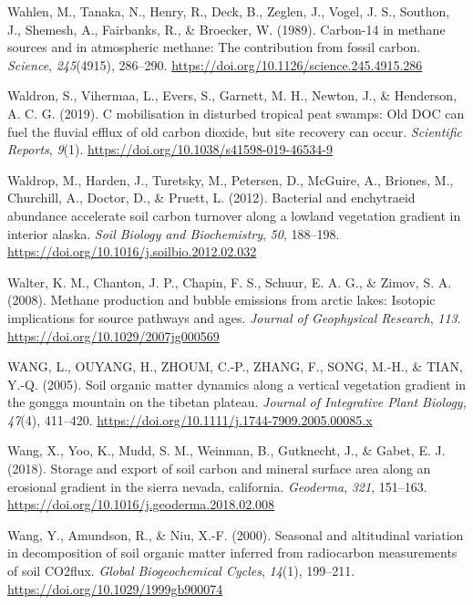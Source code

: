 \documentclass[]{article}
\begin{document}
\leavevmode\hypertarget{ref-Wahlen_1989}{}%
Wahlen, M., Tanaka, N., Henry, R., Deck, B., Zeglen, J., Vogel, J. S.,
Southon, J., Shemesh, A., Fairbanks, R., \& Broecker, W. (1989).
Carbon-14 in methane sources and in atmospheric methane: The
contribution from fossil carbon. \emph{Science}, \emph{245}(4915),
286--290. \url{https://doi.org/10.1126/science.245.4915.286}

\leavevmode\hypertarget{ref-Waldron_2019}{}%
Waldron, S., Vihermaa, L., Evers, S., Garnett, M. H., Newton, J., \&
Henderson, A. C. G. (2019). C mobilisation in disturbed tropical peat
swamps: Old DOC can fuel the fluvial efflux of old carbon dioxide, but
site recovery can occur. \emph{Scientific Reports}, \emph{9}(1).
\url{https://doi.org/10.1038/s41598-019-46534-9}

\leavevmode\hypertarget{ref-Waldrop_2012}{}%
Waldrop, M., Harden, J., Turetsky, M., Petersen, D., McGuire, A.,
Briones, M., Churchill, A., Doctor, D., \& Pruett, L. (2012). Bacterial
and enchytraeid abundance accelerate soil carbon turnover along a
lowland vegetation gradient in interior alaska. \emph{Soil Biology and
Biochemistry}, \emph{50}, 188--198.
\url{https://doi.org/10.1016/j.soilbio.2012.02.032}

\leavevmode\hypertarget{ref-Walter_2008}{}%
Walter, K. M., Chanton, J. P., Chapin, F. S., Schuur, E. A. G., \&
Zimov, S. A. (2008). Methane production and bubble emissions from arctic
lakes: Isotopic implications for source pathways and ages. \emph{Journal
of Geophysical Research}, \emph{113}.
\url{https://doi.org/10.1029/2007jg000569}

\leavevmode\hypertarget{ref-WANG_2005}{}%
WANG, L., OUYANG, H., ZHOUM, C.-P., ZHANG, F., SONG, M.-H., \& TIAN,
Y.-Q. (2005). Soil organic matter dynamics along a vertical vegetation
gradient in the gongga mountain on the tibetan plateau. \emph{Journal of
Integrative Plant Biology}, \emph{47}(4), 411--420.
\url{https://doi.org/10.1111/j.1744-7909.2005.00085.x}

\leavevmode\hypertarget{ref-Wang_2018}{}%
Wang, X., Yoo, K., Mudd, S. M., Weinman, B., Gutknecht, J., \& Gabet, E.
J. (2018). Storage and export of soil carbon and mineral surface area
along an erosional gradient in the sierra nevada, california.
\emph{Geoderma}, \emph{321}, 151--163.
\url{https://doi.org/10.1016/j.geoderma.2018.02.008}

\leavevmode\hypertarget{ref-Wang_2000}{}%
Wang, Y., Amundson, R., \& Niu, X.-F. (2000). Seasonal and altitudinal
variation in decomposition of soil organic matter inferred from
radiocarbon measurements of soil CO2flux. \emph{Global Biogeochemical
Cycles}, \emph{14}(1), 199--211.
\url{https://doi.org/10.1029/1999gb900074}
\end{document}
